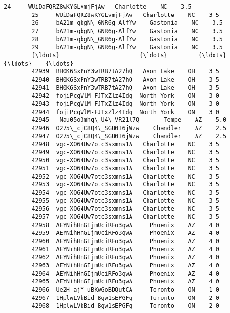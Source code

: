 \documentclass[11pt]{article}
\begin{document}
\begin{Verbatim}[commandchars=\\\{\}]
        24     WUiDaFQRZ8wKYGLvmjFjAw   Charlotte    NC    3.5   
        25     WUiDaFQRZ8wKYGLvmjFjAw   Charlotte    NC    3.5   
        26     bA21m-qbgN\_GNR6g-AlfYw    Gastonia    NC    3.5   
        27     bA21m-qbgN\_GNR6g-AlfYw    Gastonia    NC    3.5   
        28     bA21m-qbgN\_GNR6g-AlfYw    Gastonia    NC    3.5   
        29     bA21m-qbgN\_GNR6g-AlfYw    Gastonia    NC    3.5   
        {\ldots}                       {\ldots}         {\ldots}   {\ldots}    {\ldots}   
        42939  BH0K6SxPnY3wTRB7tA27hQ   Avon Lake    OH    3.5   
        42940  BH0K6SxPnY3wTRB7tA27hQ   Avon Lake    OH    3.5   
        42941  BH0K6SxPnY3wTRB7tA27hQ   Avon Lake    OH    3.5   
        42942  fojiPcgWlM-FJTxZlz4Idg  North York    ON    3.0   
        42943  fojiPcgWlM-FJTxZlz4Idg  North York    ON    3.0   
        42944  fojiPcgWlM-FJTxZlz4Idg  North York    ON    3.0   
        42945  -Nau05o3mhq\_U4\_VR21l7Q       Tempe    AZ    5.0   
        42946  O275\_cjC8Q4\_SGU0I6jWzw    Chandler    AZ    2.5   
        42947  O275\_cjC8Q4\_SGU0I6jWzw    Chandler    AZ    2.5   
        42948  vgc-XO64Uw7otc3sxmns1A   Charlotte    NC    3.5   
        42949  vgc-XO64Uw7otc3sxmns1A   Charlotte    NC    3.5   
        42950  vgc-XO64Uw7otc3sxmns1A   Charlotte    NC    3.5   
        42951  vgc-XO64Uw7otc3sxmns1A   Charlotte    NC    3.5   
        42952  vgc-XO64Uw7otc3sxmns1A   Charlotte    NC    3.5   
        42953  vgc-XO64Uw7otc3sxmns1A   Charlotte    NC    3.5   
        42954  vgc-XO64Uw7otc3sxmns1A   Charlotte    NC    3.5   
        42955  vgc-XO64Uw7otc3sxmns1A   Charlotte    NC    3.5   
        42956  vgc-XO64Uw7otc3sxmns1A   Charlotte    NC    3.5   
        42957  vgc-XO64Uw7otc3sxmns1A   Charlotte    NC    3.5   
        42958  AEYNihHmGIjmUciRFo3qwA     Phoenix    AZ    4.0   
        42959  AEYNihHmGIjmUciRFo3qwA     Phoenix    AZ    4.0   
        42960  AEYNihHmGIjmUciRFo3qwA     Phoenix    AZ    4.0   
        42961  AEYNihHmGIjmUciRFo3qwA     Phoenix    AZ    4.0   
        42962  AEYNihHmGIjmUciRFo3qwA     Phoenix    AZ    4.0   
        42963  AEYNihHmGIjmUciRFo3qwA     Phoenix    AZ    4.0   
        42964  AEYNihHmGIjmUciRFo3qwA     Phoenix    AZ    4.0   
        42965  AEYNihHmGIjmUciRFo3qwA     Phoenix    AZ    4.0   
        42966  Ue2H-ajY-uBKwGoBDQutCA     Toronto    ON    1.0   
        42967  1HplwLVbBid-Bgw1sEPGFg     Toronto    ON    2.0   
        42968  1HplwLVbBid-Bgw1sEPGFg     Toronto    ON    2.0   
        

\end{Verbatim}
\end{document}
